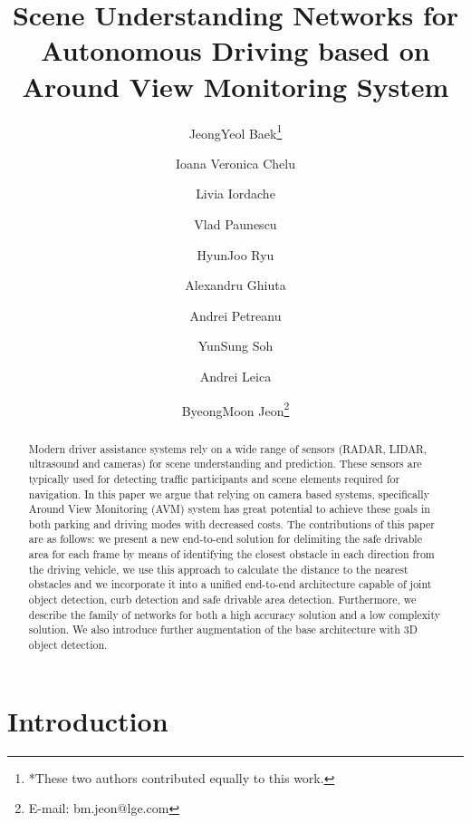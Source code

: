 \documentclass[10pt,twocolumn,letterpaper]{article}
\begin{document}
\title{Scene Understanding Networks for Autonomous Driving based on Around View Monitoring System}




\renewcommand\footnotemark{}
\author[1,*]{JeongYeol Baek\thanks{*\:These two authors contributed equally to this work.}}
\author[2,*]{Ioana Veronica Chelu}
\author[2]{Livia Iordache}
\author[2]{Vlad Paunescu}
\author[1]{HyunJoo Ryu}
\author[2]{Alexandru Ghiuta}
\author[2]{Andrei Petreanu}
\author[1]{YunSung Soh}
\author[2]{Andrei Leica}
\author[1,\dag]{ByeongMoon Jeon\thanks{\dag\: E-mail: bm.jeon@lge.com}}






\maketitle
\thispagestyle{empty}

\begin{abstract}
   Modern driver assistance systems rely on a wide range of sensors (RADAR, LIDAR, ultrasound and cameras) for scene understanding and prediction. These sensors are typically used for detecting traffic participants and scene elements required for navigation. In this paper we argue that relying on camera based systems, specifically Around View Monitoring (AVM) system has great potential to achieve these goals in both parking and driving modes with decreased costs. The contributions of this paper are as follows: we present a new end-to-end solution for delimiting the safe drivable area for each frame by means of identifying the closest obstacle in each direction from the driving vehicle, we use this approach to calculate the distance to the nearest obstacles and we incorporate it into a unified end-to-end architecture capable of joint object detection, curb detection and safe drivable area detection. Furthermore, we describe the family of networks for both a high accuracy solution and a low complexity solution. We also introduce further augmentation of the base architecture with 3D object detection.
\end{abstract}

\section{Introduction}
\end{document}
